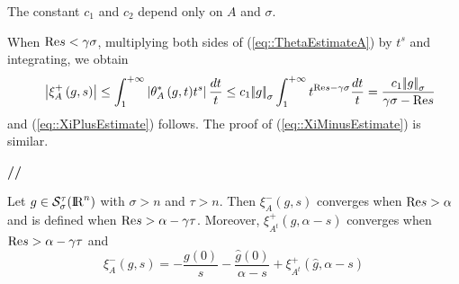 \documentclass[12pt,a4paper]{amsart}
\begin{document}
{\begin{lemma}
The constant ${c}_1$ and ${c}_2$ depend only on ${A}$ and ${\sigma}$.
\end{lemma}

{\removelastskip\par\medskip\goodbreak{}}
When ${\mathop{\rm Re}\nolimits}{s}<{\gamma}{\sigma}$,
multiplying both sides of (\ref{eq::ThetaEstimateA})
by ${t}^{s}$ and integrating, we obtain
\begin{eqnarray}
&&{\left|{{{\xi}_{{A}}^+\left({g},{s}\right)}}\right|}\leq
	\int_1^{+\infty}\left|{{\theta}_{{A}}^*\left({{g}},{{t}}\right)}
			{t}^{s}\right|\frac{d{t}}{t}\leq
	{c}_1{{\left|\!\left|{g}\right|\!\right|}_{\sigma}}
		\int_1^{+\infty}{t}^{{\mathop{\rm Re}\nolimits}{s}-{\gamma}{\sigma}}
			\frac{d{t}}{t}=
		\frac{{c}_1{{\left|\!\left|{g}\right|\!\right|}_{\sigma}}}
			{{\gamma}{\sigma}-{\mathop{\rm Re}\nolimits}{s}}
\nonumber
\end{eqnarray}
and (\ref{eq::XiPlusEstimate}) follows.
The proof of (\ref{eq::XiMinusEstimate}) is similar.
{{\bf //}\par\smallskip}

\begin{proposition}\label{prop::XiMinusEstimate}
Let ${g}\in{{\mathcal{S}}_{\sigma}^{{\tau}}({{\rm I\kern-.185em R}}^{n})}$
with ${\sigma}>{n}$ and ${\tau}>{n}$.
Then ${{\xi}_{A}^-\left({g},{s}\right)}$
converges when ${\mathop{\rm Re}\nolimits}{s}>{\alpha}$ and
is defined when
${\mathop{\rm Re}\nolimits}{s}>{\alpha}-{\gamma}{\tau}$.
Moreover,
${{\xi}_{{{\left.{{A}}\right.}^t}}^+\left({\hat{g}},{{\alpha}-{s}}\right)}$
converges when ${\mathop{\rm Re}\nolimits}{s}>{\alpha}-{\gamma}{\tau}$
and
\begin{equation}
{{\xi}_{A}^-\left({g},{s}\right)}=
	-\frac{{g}(0)}{s}
	-\frac{\hat{g}(0)}{{\alpha}-{s}}
	+{{\xi}_{{{\left.{{A}}\right.}^t}}^+\left({\hat{g}},{{\alpha}-{s}}\right)}
\end{equation}
\end{proposition}

}
\end{document}
